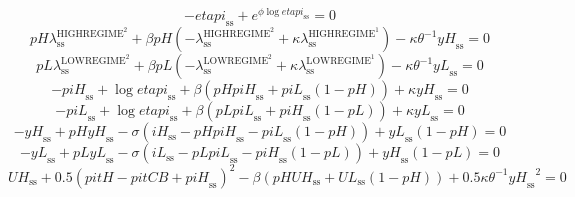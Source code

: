 \begin{equation}
-{e\!t\!a\!p\!i}_\mathrm{ss} + e^{{\phi} {\log{{e\!t\!a\!p\!i}_\mathrm{ss}}}} = 0
\end{equation}
\begin{equation}
{{p\!H}} {\lambda^{\mathrm{HIGHREGIME}^{\mathrm{2}}}_\mathrm{ss}} + {\beta} {{p\!H}} \left(-\lambda^{\mathrm{HIGHREGIME}^{\mathrm{2}}}_\mathrm{ss} + {\kappa} {\lambda^{\mathrm{HIGHREGIME}^{\mathrm{1}}}_\mathrm{ss}}\right) - {\kappa} {\theta}^{-1} {{y\!H}_\mathrm{ss}} = 0
\end{equation}
\begin{equation}
{{p\!L}} {\lambda^{\mathrm{LOWREGIME}^{\mathrm{2}}}_\mathrm{ss}} + {\beta} {{p\!L}} \left(-\lambda^{\mathrm{LOWREGIME}^{\mathrm{2}}}_\mathrm{ss} + {\kappa} {\lambda^{\mathrm{LOWREGIME}^{\mathrm{1}}}_\mathrm{ss}}\right) - {\kappa} {\theta}^{-1} {{y\!L}_\mathrm{ss}} = 0
\end{equation}
\begin{equation}
-{p\!i\!H}_\mathrm{ss} + \log{{e\!t\!a\!p\!i}_\mathrm{ss}} + {\beta} \left({{p\!H}} {{p\!i\!H}_\mathrm{ss}} + {{p\!i\!L}_\mathrm{ss}} \left(1 - {p\!H}\right)\right) + {\kappa} {{y\!H}_\mathrm{ss}} = 0
\end{equation}
\begin{equation}
-{p\!i\!L}_\mathrm{ss} + \log{{e\!t\!a\!p\!i}_\mathrm{ss}} + {\beta} \left({{p\!L}} {{p\!i\!L}_\mathrm{ss}} + {{p\!i\!H}_\mathrm{ss}} \left(1 - {p\!L}\right)\right) + {\kappa} {{y\!L}_\mathrm{ss}} = 0
\end{equation}
\begin{equation}
-{y\!H}_\mathrm{ss} + {{p\!H}} {{y\!H}_\mathrm{ss}} - {\sigma} \left({i\!H}_\mathrm{ss} - {{p\!H}} {{p\!i\!H}_\mathrm{ss}} - {{p\!i\!L}_\mathrm{ss}} \left(1 - {p\!H}\right)\right) + {{y\!L}_\mathrm{ss}} \left(1 - {p\!H}\right) = 0
\end{equation}
\begin{equation}
-{y\!L}_\mathrm{ss} + {{p\!L}} {{y\!L}_\mathrm{ss}} - {\sigma} \left({i\!L}_\mathrm{ss} - {{p\!L}} {{p\!i\!L}_\mathrm{ss}} - {{p\!i\!H}_\mathrm{ss}} \left(1 - {p\!L}\right)\right) + {{y\!H}_\mathrm{ss}} \left(1 - {p\!L}\right) = 0
\end{equation}
\begin{equation}
{U\!H}_\mathrm{ss} + 0.5\left({p\!i\!t\!H} - {p\!i\!t\!C\!B} + {p\!i\!H}_\mathrm{ss}\right)^{2} - {\beta} \left({{p\!H}} {{U\!H}_\mathrm{ss}} + {{U\!L}_\mathrm{ss}} \left(1 - {p\!H}\right)\right) + 0.5{\kappa} {\theta}^{-1} {{y\!H}_\mathrm{ss}}^{2} = 0
\end{equation}
